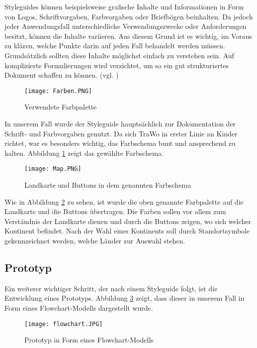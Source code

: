 Styleguides können beispielsweise grafische Inhalte und Informationen in Form von Logos, Schriftvorgaben, Farbvorgaben oder Briefbögen beinhalten. Da jedoch jeder Anwendungsfall unterschiedliche Verwendungszwecke oder Anforderungen besitzt, können die Inhalte variieren. Aus diesem Grund ist es wichtig, im Voraus zu klären, welche Punkte darin auf jeden Fall behandelt werden müssen. Grundsätzlich sollten diese Inhalte möglichst einfach zu verstehen sein. Auf komplizierte Formulierungen wird verzichtet, um so ein gut strukturiertes Dokument schaffen zu können. (vgl. \cite{Styleguide})

\begin{figure} [h]
\centering
\texttt{[image: Farben.PNG]}
\caption{Verwendete Farbpalette}
\label{fig:farben}
\end{figure}

In unserem Fall wurde der Styleguide hauptsächlich zur Dokumentation der Schrift- und Farbvorgaben genutzt. Da sich TraWo in erster Linie an Kinder richtet, war es besonders wichtig, das Farbschema bunt und ansprechend zu halten. Abbildung \ref{fig:farben} zeigt das gewählte Farbschema.

\begin{figure} [h]
\centering
\texttt{[image: Map.PNG]}
\caption{Landkarte und Buttons in dem genannten Farbschema}
\label{fig:map}
\end{figure}

Wie in Abbildung \ref{fig:map} zu sehen, ist wurde die oben genannte Farbpalette auf die Landkarte und die Buttons übertragen. Die Farben sollen vor allem zum Verständnis der Landkarte dienen und durch die Buttons zeigen, wo sich welcher Kontinent befindet. Nach der Wahl eines Kontinents soll durch Standortsymbole gekennzeichnet werden, welche Länder zur Auswahl stehen.

\subsection{Prototyp}\label{prototyp}
Ein weiterer wichtiger Schritt, der nach einem Styleguide folgt, ist die Entwicklung eines Prototyps. Abbildung \ref{fig:flowchart} zeigt, dass dieser in unserem Fall in Form eines Flowchart-Modells dargestellt wurde.

\begin{figure} [htb!]
\centering
\texttt{[image: flowchart.JPG]}
\caption{Prototyp in Form eines Flowchart-Modells}
\label{fig:flowchart}
\end{figure}

